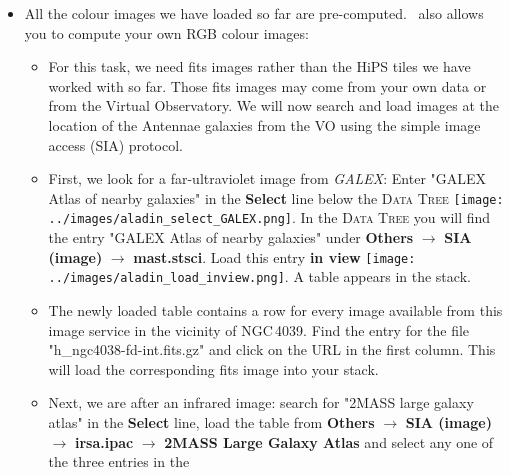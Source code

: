 \documentclass [a4paper, 12pt]{article}
\begin{document}
\begin{itemize}
    \item All the colour images we have loaded so far are pre-computed. \aladin\
    also allows you to compute your own RGB colour images:
     \begin{itemize}
         \item For this task, we need fits images rather than the HiPS tiles we have
         worked with so far. Those fits images may come from your own data or
         from the Virtual Observatory. We will now search and load images at
         the location of the Antennae galaxies from the VO using the simple image
         access (SIA) protocol.
         \item First, we look for a far-ultraviolet image from
         \textit{GALEX}: Enter "GALEX Atlas of nearby galaxies" in the
         \textbf{Select} line below the
         \textsc{Data Tree} \texttt{[image: ../images/aladin\_select\_GALEX.png]}. In the \textsc{Data
         Tree} you will find the entry "GALEX Atlas of nearby galaxies" under
         \textbf{Others} $\rightarrow$ \textbf{SIA (image)} $\rightarrow$
         \textbf{mast.stsci}. Load this entry \textbf{in view}
         \texttt{[image: ../images/aladin\_load\_inview.png]}.
         A table appears in the stack.
         \item The newly loaded table contains a row for every image available
         from this image service in the vicinity of NGC\,4039. Find the entry
         for the file "h\_ngc4038-fd-int.fits.gz" and click on the URL in the
         first column. This will load the corresponding fits image into your
         stack.
         \item Next, we are after an infrared image: search for "2MASS large
         galaxy atlas" in the \textbf{Select} line, load the table from
         \textbf{Others} $\rightarrow$ \textbf{SIA (image)} $\rightarrow$
         \textbf{irsa.ipac} $\rightarrow$ \textbf{2MASS Large Galaxy Atlas}
         and select any one of the three entries in the

\end{itemize}
\end{itemize}
\end{document}
